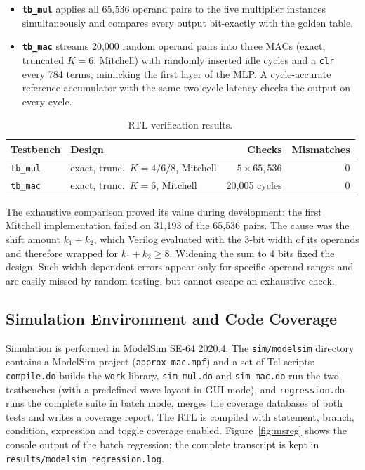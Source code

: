 \documentclass[11pt,a4paper]{article}
\begin{document}
\begin{itemize}[nosep]
  \item \textbf{\texttt{tb\_mul}} applies all 65{,}536 operand pairs to the
        five multiplier instances simultaneously and compares every output
        bit-exactly with the golden table.
  \item \textbf{\texttt{tb\_mac}} streams 20{,}000 random operand pairs into
        three MACs (exact, truncated $K{=}6$, Mitchell) with randomly
        inserted idle cycles and a \texttt{clr} every 784 terms, mimicking
        the first layer of the MLP. A cycle-accurate reference accumulator
        with the same two-cycle latency checks the output on every cycle.
\end{itemize}

\begin{table}[H]
\centering
\caption{RTL verification results.}
\label{tab:verif}
\begin{tabular}{llrr}
\toprule
Testbench & Design & Checks & Mismatches \\
\midrule
\texttt{tb\_mul} & exact, trunc.\ $K{=}4/6/8$, Mitchell & $5\times65{,}536$ & 0 \\
\midrule
\texttt{tb\_mac} & exact, trunc.\ $K{=}6$, Mitchell & 20{,}005 cycles & 0 \\
\bottomrule
\end{tabular}
\end{table}

The exhaustive comparison proved its value during development: the first
Mitchell implementation failed on 31{,}193 of the 65{,}536 pairs. The
cause was the shift amount $k_1+k_2$, which Verilog evaluated with the
3-bit width of its operands and therefore wrapped for $k_1+k_2\ge 8$.
Widening the sum to 4 bits fixed the design. Such width-dependent errors
appear only for specific operand ranges and are easily missed by random
testing, but cannot escape an exhaustive check.

\subsection{Simulation Environment and Code Coverage}
Simulation is performed in ModelSim SE-64 2020.4. The
\texttt{sim/modelsim} directory contains a ModelSim project
(\texttt{approx\_mac.mpf}) and a set of Tcl scripts: \texttt{compile.do}
builds the \texttt{work} library, \texttt{sim\_mul.do} and
\texttt{sim\_mac.do} run the two testbenches (with a predefined wave layout
in GUI mode), and \texttt{regression.do} runs the complete suite in batch
mode, merges the coverage databases of both tests and writes a coverage
report. The RTL is compiled with statement, branch, condition, expression
and toggle coverage enabled. Figure~\ref{fig:msreg} shows the console
output of the batch regression; the complete transcript is kept in
\texttt{results/modelsim\_regression.log}.
\end{document}
